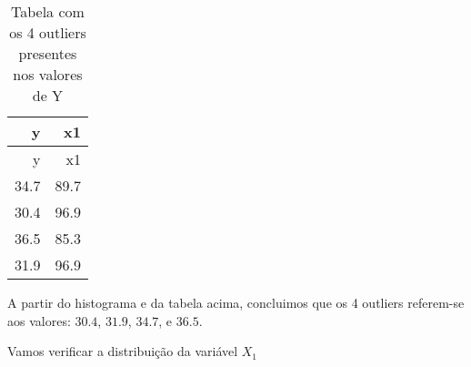 \documentclass[
]{article}
\newenvironment{Shaded}{\begin{snugshade}}{\end{snugshade}}
\newcommand{\DataTypeTok}[1]{\textcolor[rgb]{0.13,0.29,0.53}{#1}}
\newcommand{\DecValTok}[1]{\textcolor[rgb]{0.00,0.00,0.81}{#1}}
\newcommand{\KeywordTok}[1]{\textcolor[rgb]{0.13,0.29,0.53}{\textbf{#1}}}
\newcommand{\NormalTok}[1]{#1}
\newcommand{\OperatorTok}[1]{\textcolor[rgb]{0.81,0.36,0.00}{\textbf{#1}}}
\newcommand{\StringTok}[1]{\textcolor[rgb]{0.31,0.60,0.02}{#1}}
\begin{document}
\begin{Shaded}
\end{Shaded}

\begin{longtable}[]{@{}rr@{}}
\caption{Tabela com os 4 outliers presentes nos valores de
Y}\tabularnewline
\toprule
y & x1\tabularnewline
\midrule
\endfirsthead
\toprule
y & x1\tabularnewline
\midrule
\endhead
34.7 & 89.7\tabularnewline
30.4 & 96.9\tabularnewline
36.5 & 85.3\tabularnewline
31.9 & 96.9\tabularnewline
\bottomrule
\end{longtable}

A partir do histograma e da tabela acima, concluimos que os 4 outliers
referem-se aos valores: \(30.4\), \(31.9\), \(34.7\), e \(36.5\).

Vamos verificar a distribuição da variável \(X_1\)
\end{document}
